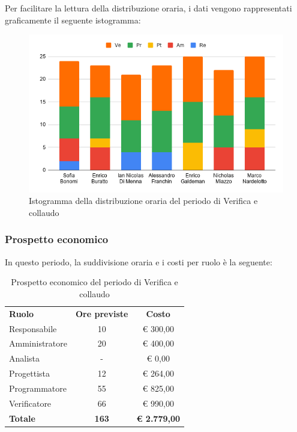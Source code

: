 \documentclass[../piano-di-progetto.tex]{subfiles}
\begin{document}
  Per facilitare la lettura della distribuzione oraria, i dati vengono rappresentati graficamente il seguente istogramma:
  \begin{figure}[H]
    \centering
    \includegraphics[width=12cm]{img/ore-verifica.png}
    \caption{Istogramma della distribuzione oraria del periodo di Verifica e collaudo}
    \label{fig:ore-componente-verifica}
  \end{figure}

  \subsubsection{Prospetto economico}
  In questo periodo, la suddivisione oraria e i costi per ruolo è la seguente:

  \begin{table}[H]
    \centering
    \begin{tabular}{lcc}
      \rowcolor{lightgray}
      \textbf{Ruolo}  & \textbf{Ore previste} & \textbf{Costo}  \\
      Responsabile    & 10           & € 300,00            \\
      Amministratore  & 20           & € 400,00            \\
      Analista        & -            & € 0,00              \\
      Progettista     & 12           & € 264,00            \\
      Programmatore   & 55           & € 825,00            \\
      Verificatore    & 66           & € 990,00            \\
      \textbf{Totale} & \textbf{163} & \textbf{€ 2.779,00}
    \end{tabular}
    \caption{Prospetto economico del periodo di Verifica e collaudo}
  \end{table}
\end{document}
